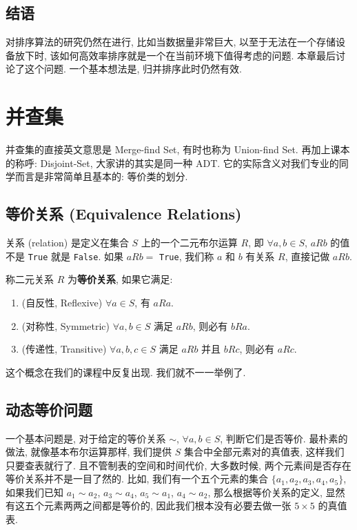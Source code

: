 \documentclass[a4paper]{ctexart}
\newcommand{\hl}[1]
{\noindent {\bf {#1}}}
\theoremstyle{definition}
\theoremstyle{definition}
\begin{document}
\subsection{结语}
对排序算法的研究仍然在进行, 比如当数据量非常巨大, 以至于无法在一个存储设备放下时,
该如何高效率排序就是一个在当前环境下值得考虑的问题. 本章最后讨论了这个问题.
一个基本想法是, 归并排序此时仍然有效.

\section{并查集}

并查集的直接英文意思是 Merge-find Set, 有时也称为 Union-find Set. 
再加上课本的称呼: Disjoint-Set, 大家讲的其实是同一种 ADT. 
它的实际含义对我们专业的同学而言是非常简单且基本的: 等价类的划分. 

\subsection{等价关系 (Equivalence Relations)}
关系 (relation) 是定义在集合 $S$ 上的一个二元布尔运算 $R$, 
即 $\forall a, b \in S$, $a R b$ 的值不是 \verb|True| 就是 \verb|False|. 
如果 $a R b =$ \verb|True|, 我们称 $a$ 和 $b$ 有关系 $R$, 直接记做 $aRb$.

\hl{定义} 称二元关系 $R$ 为{\bfseries 等价关系}, 如果它满足:
\begin{enumerate}
  \item (自反性, Reﬂexive) $\forall a \in S$, 有 $aRa$.
  \item (对称性, Symmetric) $\forall a, b \in S$ 满足 $aRb$, 则必有 $bRa$.
  \item (传递性, Transitive) $\forall a, b, c \in S$ 满足 $aRb$ 并且 $bRc$, 则必有 $aRc$.
\end{enumerate}

这个概念在我们的课程中反复出现. 我们就不一一举例了. 

\subsection{动态等价问题}

一个基本问题是, 对于给定的等价关系 $\sim$, $\forall a, b \in S$, 判断它们是否等价. 
最朴素的做法, 就像基本布尔运算那样, 我们提供 $S$ 集合中全部元素对的真值表, 
这样我们只要查表就行了. 且不管制表的空间和时间代价, 大多数时候, 两个元素间是否存在等价关系并不是一目了然的. 
比如, 我们有一个五个元素的集合 $\{a_1, a_2, a_3, a_4, a_5\}$, 如果我们已知 $a_1 \sim a_2$, $a_3 \sim a_4$, 
$a_5 \sim a_1$, $a_4 \sim a_2$, 那么根据等价关系的定义, 显然有这五个元素两两之间都是等价的, 
因此我们根本没有必要去做一张 $5 \times 5$ 的真值表. 
\end{document}
